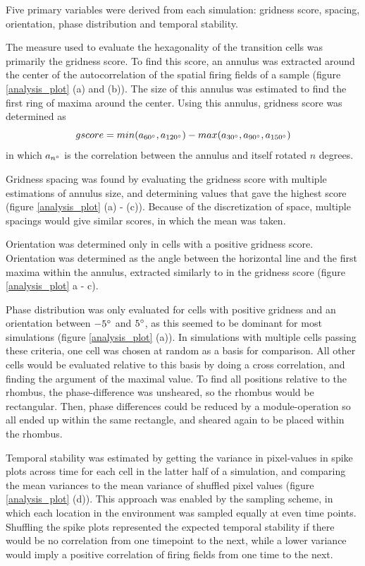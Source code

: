 \documentclass{article}
\begin{document}
    Five primary variables were derived from each simulation: gridness score, spacing, orientation, phase distribution and temporal stability.
    
    The measure used to evaluate the hexagonality of the transition cells was primarily the gridness score. To find this score, an annulus was extracted around the center of the autocorrelation of the spatial firing fields of a sample (figure \ref{analysis_plot} (a) and (b)). The size of this annulus was estimated to find the first ring of maxima around the center. Using this annulus, gridness score was determined as \[gscore = min(a_{60\degree}, a_{120\degree}) - max(a_{30\degree}, a_{90\degree}, a_{150\degree})\] in which \(a_{n\degree}\) is the correlation between the annulus and itself rotated \(n\) degrees.

    Gridness spacing was found by evaluating the gridness score with multiple estimations of annulus size, and determining values that gave the highest score (figure \ref{analysis_plot} (a) - (c)). Because of the discretization of space, multiple spacings would give similar scores, in which the mean was taken.

    Orientation was determined only in cells with a positive gridness score. Orientation was determined as the angle between the horizontal line and the first maxima within the annulus, extracted similarly to in the gridness score (figure \ref{analysis_plot} a - c).

    Phase distribution was only evaluated for cells with positive gridness and an orientation between \(-5\degree\) and \(5\degree\), as this seemed to be dominant for most simulations (figure \ref{analysis_plot} (a)). In simulations with multiple cells passing these criteria, one cell was chosen at random as a basis for comparison. All other cells would be evaluated relative to this basis by doing a cross correlation, and finding the argument of the maximal value. To find all positions relative to the rhombus, the phase-difference was unsheared, so the rhombus would be rectangular. Then, phase differences could be reduced by a module-operation so all ended up within the same rectangle, and sheared again to be placed within the rhombus.
    
    Temporal stability was estimated by getting the variance in pixel-values in spike plots across time for each cell in the latter half of a simulation, and comparing the mean variances to the mean variance of shuffled pixel values (figure \ref{analysis_plot} (d)). This approach was enabled by the sampling scheme, in which each location in the environment was sampled equally at even time points. Shuffling the spike plots represented the expected temporal stability if there would be no correlation from one timepoint to the next, while a lower variance would imply a positive correlation of firing fields from one time to the next.
\end{document}
